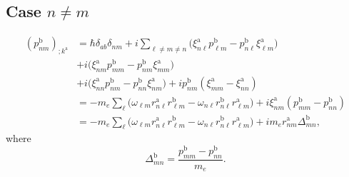 \subsection{Case \texorpdfstring{$n\ne m$}{n!=m}}
\begin{align}\label{mes}
(p^{\mathrm{b}}_{nm})_{;k^{\mathrm{a}}}&=
\hbar\delta_{ab}\delta_{nm}
+i
\sum_{\ell\ne m\ne n}
\bigg(
\xi^{\mathrm{a}}_{n\ell}
p^{\mathrm{b}}_{\ell m}
-
p^{\mathrm{b}}_{n\ell}
\xi^{\mathrm{a}}_{\ell m}
\bigg)
\nonumber\\
&+
i
\bigg(
\xi^{\mathrm{a}}_{nm}
p^{\mathrm{b}}_{mm}
-
p^{\mathrm{b}}_{nm}
\xi^{\mathrm{a}}_{mm}
\bigg)
\nonumber\\
&+
i
\bigg(
\xi^{\mathrm{a}}_{nn}
p^{\mathrm{b}}_{nm}
-
p^{\mathrm{b}}_{nn}
\xi^{\mathrm{a}}_{nm}
\bigg)
+i
p^{\mathrm{b}}_{nm}(\xi^{\mathrm{a}}_{mm}
-
\xi^{\mathrm{a}}_{nn}
)
\nonumber \\
&=
-m_e
\sum_{\ell}
\bigg(
\omega_{\ell m}
r^{\mathrm{a}}_{n\ell}
r^{\mathrm{b}}_{\ell m}
-
\omega_{n\ell}
r^{\mathrm{b}}_{n\ell}
r^{\mathrm{a}}_{\ell m}
\bigg)
+i
\xi^{\mathrm{a}}_{nm}
(p^{\mathrm{b}}_{mm}
-
p^{\mathrm{b}}_{nn}
)
\nonumber \\
&=
-m_e
\sum_{\ell}
\bigg(
\omega_{\ell m} 
r^{\mathrm{a}}_{n\ell} 
r^{\mathrm{b}}_{\ell m}
-
\omega_{n\ell} 
r^{\mathrm{b}}_{n\ell} 
r^{\mathrm{a}}_{\ell m}
\bigg)
+i 
m_er^{\mathrm{a}}_{nm}
\Delta^{\mathrm{b}}_{mn}
,
\end{align} 
where
\begin{equation}\label{a_delta}
\Delta^{\mathrm{b}}_{mn}=\frac{p^{\mathrm{b}}_{mm}-p^{\mathrm{b}}_{nn}}{m_e}
.
\end{equation}

